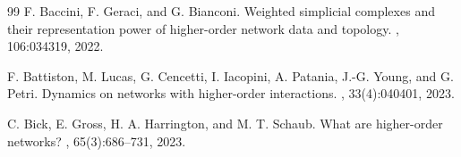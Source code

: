 \documentclass[11pt]{article}
\begin{document}
\begin{thebibliography}{99}
F. Baccini, F. Geraci, and G. Bianconi.
\newblock Weighted simplicial complexes and their representation power of higher-order network data and topology.
, 106:034319, 2022.

F. Battiston, M. Lucas, G. Cencetti, I. Iacopini, A. Patania, J.-G. Young, and G. Petri.
\newblock Dynamics on networks with higher-order interactions.
, 33(4):040401, 2023.

C. Bick, E. Gross, H. A. Harrington, and M. T. Schaub.
\newblock What are higher-order networks?
, 65(3):686--731, 2023.

\end{thebibliography}
\end{document}
